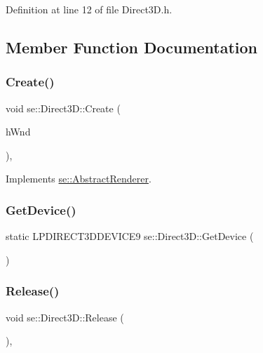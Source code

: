 Definition at line 12 of file Direct3\+D.\+h.



\subsection{Member Function Documentation}
\mbox{\label{classse_1_1_direct3_d_a316456762829db0614077cccd655e654}} 
\subsubsection{\texorpdfstring{Create()}{Create()}}
{\footnotesize\ttfamily void se\+::\+Direct3\+D\+::\+Create (\begin{DoxyParamCaption}\item[{H\+W\+ND}]{h\+Wnd }\end{DoxyParamCaption})\hspace{0.3cm}{\ttfamily [override]}, {\ttfamily [virtual]}}



Implements \mbox{\hyperlink{classse_1_1_abstract_renderer_afdfce8b91028448c17ce27550827f192}{se\+::\+Abstract\+Renderer}}.

\mbox{\label{classse_1_1_direct3_d_af37600089f9754a90e615210a6bee4f7}} 
\subsubsection{\texorpdfstring{Get\+Device()}{GetDevice()}}
{\footnotesize\ttfamily static L\+P\+D\+I\+R\+E\+C\+T3\+D\+D\+E\+V\+I\+C\+E9 se\+::\+Direct3\+D\+::\+Get\+Device (\begin{DoxyParamCaption}{ }\end{DoxyParamCaption})\hspace{0.3cm}{\ttfamily [static]}}

\mbox{\label{classse_1_1_direct3_d_ae2979f16a5c35773cf2c243d8e6f90e4}} 
\subsubsection{\texorpdfstring{Release()}{Release()}}
{\footnotesize\ttfamily void se\+::\+Direct3\+D\+::\+Release (\begin{DoxyParamCaption}{ }\end{DoxyParamCaption})\hspace{0.3cm}{\ttfamily [override]}, {\ttfamily [virtual]}}



